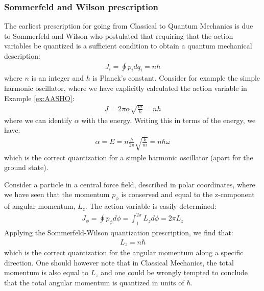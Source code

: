 \subsubsection{Sommerfeld and Wilson prescription}
The earliest prescription for going from Classical to Quantum Mechanics is due to Sommerfeld and Wilson who postulated that requiring that the action variables be quantized is a sufficient condition to obtain a quantum mechanical description:
\begin{align}
J_i=\oint p_i dq_i=nh
\end{align}
where $n$ is an integer and $h$ is Planck's constant. Consider for example the simple harmonic oscillator, where we have explicitly calculated the action variable in Example \ref{ex:AASHO}:
\begin{align}
J=2\pi\alpha\sqrt{\frac{m}{k}}=nh
\end{align}
where we can identify $\alpha$ with the energy. Writing this in terms of the energy, we have:
\begin{align}
\alpha=E=n \frac{h}{2\pi}\sqrt{\frac{k}{m}}=n\hbar\omega
\end{align}
which is the correct quantization for a simple harmonic oscillator (apart for the ground state). 

Consider a particle in a central force field, described in polar coordinates, where we have seen that the momentum $p_\phi$ is conserved and equal to the z-component of angular momentum, $L_z$. The action variable is easily determined:
\begin{align}
J_\phi=\oint p_\phi d\phi=\int_)^{2\pi}L_zd\phi=2\pi L_z
\end{align}
Applying the Sommerfeld-Wilson quantization prescription, we find that:
\begin{align}
L_z=n\hbar
\end{align}
which is the correct quantization for the angular momentum along a specific direction. One should however note that in Classical Mechanics, the total momentum is also equal to $L_z$ and one could be wrongly tempted to conclude that the total angular momentum is quantized in units of $\hbar$.

